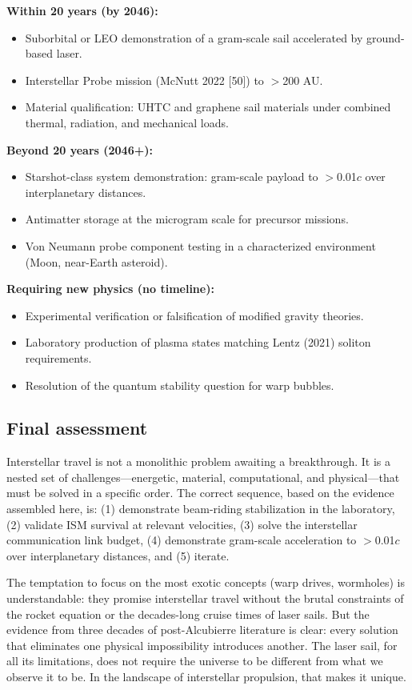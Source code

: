 \documentclass[11pt,a4paper,onecolumn]{article}
\begin{document}
\textbf{Within 20 years (by 2046):}
\begin{itemize}
  \item Suborbital or LEO demonstration of a gram-scale sail accelerated by ground-based laser.
  \item Interstellar Probe mission (McNutt 2022 [50]) to $>$200 AU.
  \item Material qualification: UHTC and graphene sail materials under combined thermal, radiation, and mechanical loads.
\end{itemize}

\textbf{Beyond 20 years (2046+):}
\begin{itemize}
  \item Starshot-class system demonstration: gram-scale payload to $>$0.01$c$ over interplanetary distances.
  \item Antimatter storage at the microgram scale for precursor missions.
  \item Von Neumann probe component testing in a characterized environment (Moon, near-Earth asteroid).
\end{itemize}

\textbf{Requiring new physics (no timeline):}
\begin{itemize}
  \item Experimental verification or falsification of modified gravity theories.
  \item Laboratory production of plasma states matching Lentz (2021) soliton requirements.
  \item Resolution of the quantum stability question for warp bubbles.
\end{itemize}

\subsection{Final assessment}

Interstellar travel is not a monolithic problem awaiting a breakthrough. It is a nested set of challenges---energetic, material, computational, and physical---that must be solved in a specific order. The correct sequence, based on the evidence assembled here, is: (1) demonstrate beam-riding stabilization in the laboratory, (2) validate ISM survival at relevant velocities, (3) solve the interstellar communication link budget, (4) demonstrate gram-scale acceleration to $>$0.01$c$ over interplanetary distances, and (5) iterate.

The temptation to focus on the most exotic concepts (warp drives, wormholes) is understandable: they promise interstellar travel without the brutal constraints of the rocket equation or the decades-long cruise times of laser sails. But the evidence from three decades of post-Alcubierre literature is clear: every solution that eliminates one physical impossibility introduces another. The laser sail, for all its limitations, does not require the universe to be different from what we observe it to be. In the landscape of interstellar propulsion, that makes it unique.
\end{document}

